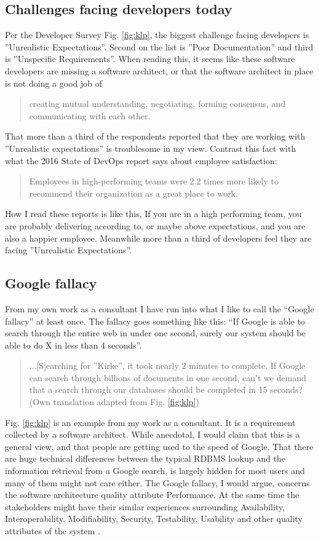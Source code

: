 \documentclass[a4paper, 10pt, conference]{IEEEtran}
\begin{document}
\subsection{Challenges facing developers today}
Per the Developer Survey \cite{c6} Fig. \ref{fig:klp}, the biggest challenge facing developers is ''Unrealistic Expectations''.  Second on the list is ''Poor Documentation'' and third is ''Unspecific Requirements''. When reading this, it seems like these software developers are missing a software architect, or that the software architect in place is not doing a good job of \blockquote{creating mutual understanding, negotiating, forming consensus, and communicating with each other\cite{c1}.}
That more than a third of the respondents reported that they are working with ''Unrealistic expectations'' is troublesome in my view. Contrast this fact with what the 2016 State of DevOps report says about employee satisfaction: \blockquote{Employees in high-performing teams were 2.2 times more likely to recommend their organization as a great place to work\cite{c2}.}
How I read these reports is like this, If you are in a high performing team, you are probably delivering according to, or maybe above expectations, and you are also a happier employee. Meanwhile more than a third of developers feel they are facing ''Unrealistic Expectations''. 

\subsection{Google fallacy}
From my own work as a consultant I have run into what I like to call the “Google fallacy” at least once. The fallacy goes something like this: “If Google is able to search through the entire web in under one second, surely our system should be able to do X in less than 4 seconds”.





\blockquote{...[S]earching for ''Kirke'', it took nearly 2 minutes to complete. If Google can search through billions of documents in one second, can’t we demand that a search through our databases should be completed in 15 seconds? (Own translation adapted from Fig. \ref{fig:klp})}


Fig. \ref{fig:klp} is an example from my work as a consultant. It is a requirement collected by a software architect. While anecdotal, I would claim that this is a general view, and that people are getting used to the speed of Google. That there are huge technical differences between the typical RDBMS lookup and the information retrieval from a Google search, is largely hidden for most users and many of them might not care either.
The Google fallacy, I would argue, concerns the software architecture quality attribute Performance.
At the same time the stakeholders might have their similar experiences surrounding Availability, Interoperability, Modifiability, Security, Testability, Usability and other quality attributes of the system \cite{c1}.
\end{document}
